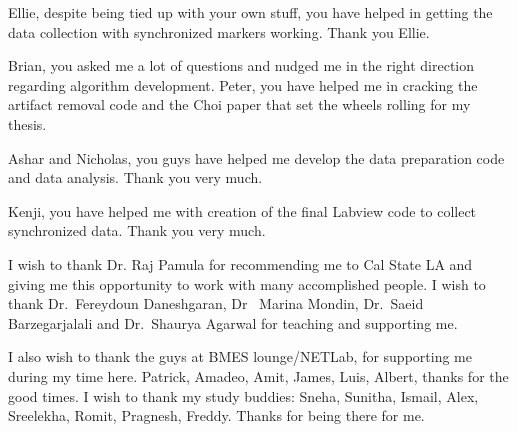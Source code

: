 \documentclass{article}
\begin{document}
Ellie, despite being tied up with your own stuff, you have helped in getting the data collection with synchronized markers working. Thank you Ellie.

Brian, you asked me a lot of questions and nudged me in the right direction regarding algorithm development. Peter, you have helped me in cracking the artifact removal code and the Choi paper that set the wheels rolling for my thesis.

Ashar and Nicholas, you guys have helped me develop the data preparation code and data analysis. Thank you very much. 

Kenji, you have helped me with creation of the final Labview code to collect synchronized data. Thank you very much.

I wish to thank Dr. Raj Pamula for recommending me to Cal State LA and giving me this opportunity to work with many accomplished people. I wish to thank Dr.~Fereydoun Daneshgaran, Dr~ Marina Mondin, Dr.~Saeid Barzegarjalali and Dr.~Shaurya Agarwal for teaching and supporting me.

I also wish to thank the guys at BMES lounge/NETLab, for supporting me during my time here. Patrick, Amadeo, Amit, James, Luis, Albert, thanks for the good times.
I wish to thank my study buddies: Sneha, Sunitha, Ismail, Alex, Sreelekha, Romit, Pragnesh, Freddy. Thanks for being there for me.
\end{document}
